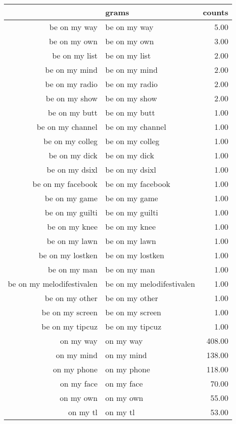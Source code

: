 \begin{table}[ht]
\centering
\begin{tabular}{rlr}
  \hline
 & grams & counts \\ 
  \hline
be on my way & be on my way & 5.00 \\ 
  be on my own & be on my own & 3.00 \\ 
  be on my list & be on my list & 2.00 \\ 
  be on my mind & be on my mind & 2.00 \\ 
  be on my radio & be on my radio & 2.00 \\ 
  be on my show & be on my show & 2.00 \\ 
  be on my butt & be on my butt & 1.00 \\ 
  be on my channel & be on my channel & 1.00 \\ 
  be on my colleg & be on my colleg & 1.00 \\ 
  be on my dick & be on my dick & 1.00 \\ 
  be on my dsixl & be on my dsixl & 1.00 \\ 
  be on my facebook & be on my facebook & 1.00 \\ 
  be on my game & be on my game & 1.00 \\ 
  be on my guilti & be on my guilti & 1.00 \\ 
  be on my knee & be on my knee & 1.00 \\ 
  be on my lawn & be on my lawn & 1.00 \\ 
  be on my lostken & be on my lostken & 1.00 \\ 
  be on my man & be on my man & 1.00 \\ 
  be on my melodifestivalen & be on my melodifestivalen & 1.00 \\ 
  be on my other & be on my other & 1.00 \\ 
  be on my screen & be on my screen & 1.00 \\ 
  be on my tipcuz & be on my tipcuz & 1.00 \\ 
  on my way & on my way & 408.00 \\ 
  on my mind & on my mind & 138.00 \\ 
  on my phone & on my phone & 118.00 \\ 
  on my face & on my face & 70.00 \\ 
  on my own & on my own & 55.00 \\ 
  on my tl & on my tl & 53.00 \\ 

\end{tabular}
\end{table}

